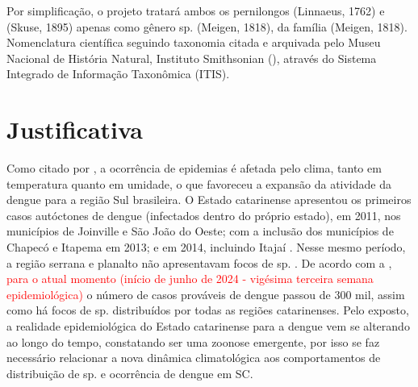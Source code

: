 \indent Por simplificação, o projeto tratará ambos os pernilongos  (Linnaeus, 1762) e  (Skuse, 1895) apenas como gênero  sp. (Meigen, 1818), da família  (Meigen, 1818). Nomenclatura científica seguindo taxonomia citada e arquivada pelo Museu Nacional de História Natural, Instituto Smithsonian (\citeyear{ITIS}), através do Sistema Integrado de Informação Taxonômica (\acrfull{ITIS}).



\newpage
\section{Justificativa}
\indent Como citado por , a ocorrência de epidemias é afetada pelo clima, tanto em temperatura quanto em umidade, o que favoreceu a expansão da atividade da dengue para a região Sul brasileira. O Estado catarinense apresentou os primeiros casos autóctones de dengue (infectados dentro do próprio estado), em 2011, nos municípios de Joinville e São João do Oeste; com a inclusão dos municípios de Chapecó e Itapema em 2013; e em 2014, incluindo Itajaí \cite{OTPCampo}. Nesse mesmo período, a região serrana e planalto não apresentavam focos de  sp. \cite{Matiola2020Dissertação}. De acordo com a , \textcolor{red}{para o atual momento (início de junho de 2024 - vigésima terceira semana epidemiológica)} o número de casos prováveis de dengue passou de 300 mil, assim como há focos de  sp. distribuídos por todas as regiões catarinenses. Pelo exposto, a realidade epidemiológica do Estado catarinense para a dengue vem se alterando ao longo do tempo, constatando ser uma zoonose emergente, por isso se faz necessário relacionar a nova dinâmica climatológica aos comportamentos de distribuição de  sp. e ocorrência de dengue em \acrlong{SC}.


 
